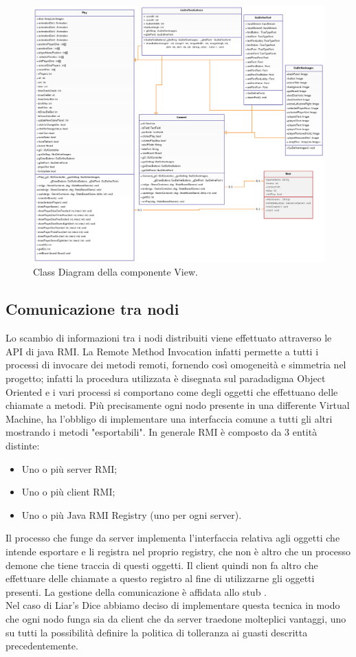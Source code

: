 \documentclass{llncs}
\begin{document}
		\newpage
		\begin{figure}[H]
			\includegraphics[scale=0.34]{img/View.png}
			\caption{\small{Class Diagram della componente View.}}
			\label{View}
		\end{figure}
		
		\subsection{Comunicazione tra nodi}
			Lo scambio di informazioni tra i nodi distribuiti viene effettuato attraverso le API di java RMI. La Remote Method Invocation infatti permette a tutti i processi di invocare dei metodi remoti, fornendo così omogeneità e simmetria nel progetto; infatti la procedura utilizzata è disegnata sul paradadigma Object Oriented e i vari processi si comportano come degli oggetti che effettuano delle chiamate a metodi.
			Più precisamente ogni nodo presente in una differente Virtual Machine, ha 
			l'obbligo di implementare una interfaccia comune a tutti gli altri mostrando i metodi "esportabili". 
			In generale RMI è composto da 3 entità distinte: 
				\begin{itemize}
					\item Uno o più server RMI;
					\item Uno o più client RMI;
					\item Uno o più Java RMI Registry (uno per ogni server).
				\end{itemize}
			Il processo che funge da server implementa l'interfaccia relativa agli oggetti che intende esportare e li registra nel proprio registry, che non è altro che un processo demone che tiene traccia di questi oggetti. Il client quindi non fa altro che effettuare delle chiamate a questo registro al fine di utilizzarne gli oggetti presenti. La gestione della comunicazione è affidata allo stub \cite{rmi}. \\
			Nel caso di Liar's Dice abbiamo deciso di implementare questa tecnica in modo che ogni nodo funga sia da client che da server traedone molteplici vantaggi, uno su tutti la possibilità definire la politica di tolleranza ai guasti descritta precedentemente.
			
\end{document}

